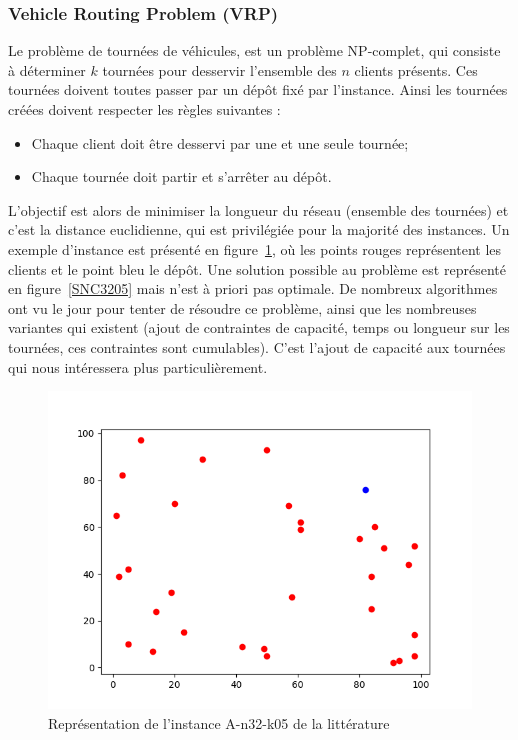 \documentclass[a4paper,11pt]{article}%
\begin{document}
\subsubsection{Vehicle Routing Problem (VRP)}

Le problème de tournées de véhicules, est un problème NP-complet, qui consiste à déterminer $k$ tournées pour desservir l'ensemble des $n$ clients présents.  
Ces tournées doivent toutes passer par un dépôt fixé par l'instance. 
Ainsi les tournées créées doivent respecter les règles suivantes :
\begin{itemize}
\item Chaque client doit être desservi par une et une seule tournée;
\item Chaque tournée doit partir et s'arrêter au dépôt.
\end{itemize}
L'objectif est alors de minimiser la longueur du réseau (ensemble des tournées) et c'est la distance euclidienne, qui est privilégiée pour la majorité des instances. 
Un exemple d'instance est présenté en figure~\ref{Instance3205}, où les points rouges représentent les clients et le point bleu le dépôt. Une solution possible au problème est représenté en figure~\ref{SNC3205} mais n'est à priori pas optimale. 
De nombreux algorithmes ont vu le jour pour tenter de résoudre ce problème, ainsi que les nombreuses variantes qui existent (ajout de contraintes de capacité, temps ou longueur sur les tournées, ces contraintes sont cumulables). 
C'est l'ajout de capacité aux tournées qui nous intéressera plus particulièrement.


\begin{figure}

\centering
\includegraphics[scale=0.5]{Instance.png}
\caption{Représentation de l'instance A-n32-k05 de la littérature}
\label{Instance3205}
\end{figure}
\end{document}
